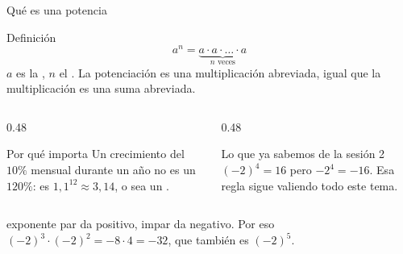 \documentclass[aspectratio=169,10pt]{beamer}
\begin{document}
\begin{frame}{Qué es una potencia}
  \scriptsize
  \begin{block}{Definición}
    \tiny
    \[ a^{n} = \underbrace{a\cdot a\cdot\dots\cdot a}_{n \text{ veces}} \]
    $a$ es la , $n$ el . La potenciación es una
    multiplicación abreviada, igual que la multiplicación es una suma
    abreviada.
  \end{block}

  \vspace{0.1cm}
  \begin{columns}[T,onlytextwidth]
    \begin{column}{0.48\textwidth}
      \begin{exampleblock}{Por qué importa}
        \tiny
        Un crecimiento del $10\%$ mensual durante un año no es un
        $120\%$: es $1{,}1^{12} \approx 3{,}14$, o sea un
        . 
      \end{exampleblock}
    \end{column}
    \begin{column}{0.48\textwidth}
      \begin{alertblock}{Lo que ya sabemos de la sesión 2}
        \tiny
        $(-2)^{4} = 16$ pero $-2^{4} = -16$.  Esa regla sigue valiendo todo este tema.
      \end{alertblock}
    \end{column}
  \end{columns}

  \vspace{0.1cm}
  {\tiny\color{uniGris}  exponente par da positivo,
  impar da negativo. Por eso $(-2)^{3}\cdot(-2)^{2} = -8\cdot 4 = -32$, que
  también es $(-2)^{5}$.}
\end{frame}
\end{document}
